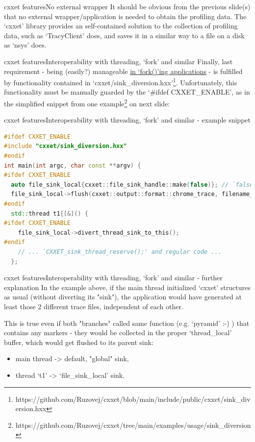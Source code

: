 \documentclass[aspectratio=169]{beamer}
\begin{document}
\begin{frame}{cxxet features}{No external wrapper}
    It should be obvious from the previous slide(s) that no external wrapper/application is needed to obtain the profiling data. The `cxxet' library provides an self-contained solution to the collection of profiling data, such as `TracyClient' does, and saves it in a similar way to a file on a disk as `nsys' does.

\end{frame}

\begin{frame}{cxxet features}{Interoperability with threading, `fork' and similar}
    Finally, last requirement - being (easily?) manageable \hyperlink{fork_handling}{in `fork()'ing applications} - is fulfilled by functionality contained in `cxxet/sink\_diversion.hxx'\footnote{https://github.com/Ruzovej/cxxet/blob/main/include/public/cxxet/sink\_diversion.hxx}. Unfortunately, this functionality must be manually guarded by the `\#ifdef CXXET\_ENABLE', as in the simplified snippet from one example\footnote{https://github.com/Ruzovej/cxxet/tree/main/examples/usage/sink\_diversion} on next slide:

\end{frame}

\begin{frame}[fragile]{cxxet features}{Interoperability with threading, `fork' and similar - example snippet}
    \begin{lstlisting}[language=C++]
#ifdef CXXET_ENABLE
#include "cxxet/sink_diversion.hxx"
#endif
int main(int argc, char const **argv) {
#ifdef CXXET_ENABLE
  auto file_sink_local{cxxet::file_sink_handle::make(false)}; // `false' - not thread safe
  file_sink_local->flush(cxxet::output::format::chrome_trace, filename_custom, true);
#endif
  std::thread t1{[&]() {
#ifdef CXXET_ENABLE
    file_sink_local->divert_thread_sink_to_this();
#endif
    // ... `CXXET_sink_thread_reserve();' and regular code ...
  };
    \end{lstlisting}

\end{frame}

\begin{frame}{cxxet features}{Interoperability with threading, `fork' and similar - further explanation}
    In the example above, if the main thread initialized `cxxet' structures as usual (without diverting its "sink"), the application would have generated at least those 2 different trace files, independent of each other.

    This is true even if both "branches" called same function (e.g. `pyramid' :-) ) that contains any markers - they would be collected in the proper `thread\_local' buffer, which would get flushed to its parent sink:

    \begin{itemize}
        \item main thread -> default, "global" sink,
        \item thread `t1' -> `file\_sink\_local' sink.
    \end{itemize}

\end{frame}
\end{document}
